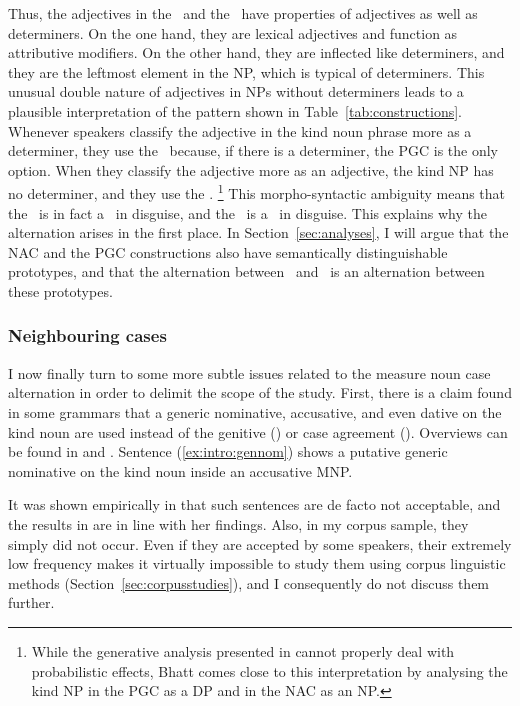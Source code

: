 Thus, the adjectives in the \NACa\ and the \PGCa\ have properties of adjectives as well as determiners.
On the one hand, they are lexical adjectives and function as attributive modifiers.
On the other hand, they are inflected like determiners, and they are the leftmost element in the NP, which is typical of determiners.
This unusual double nature of adjectives in NPs without determiners leads to a plausible interpretation of the pattern shown in Table~\ref{tab:constructions}.
Whenever speakers classify the adjective in the kind noun phrase more as a determiner, they use the \PGCa\ because, if there is a determiner, the PGC is the only option.
When they classify the adjective more as an adjective, the kind NP has no determiner, and they use the \NACa.%
\footnote{While the generative analysis presented in \cite{Bhatt1990} cannot properly deal with probabilistic effects, Bhatt comes close to this interpretation by analysing the kind NP in the PGC as a DP and in the NAC as an NP.}
This morpho-syntactic ambiguity means that the \NACa\ is in fact a \NACb\ in disguise, and the \PGCa\ is a \PGCd\ in disguise.
This explains why the alternation arises in the first place.
In Section~\ref{sec:analyses}, I will argue that the NAC and the PGC constructions also have semantically distinguishable prototypes, and that the alternation between \PGCa\ and \NACa\ is an alternation between these prototypes.

\subsubsection{Neighbouring cases}
\label{sec:neighbouringcases}

I now finally turn to some more subtle issues related to the measure noun case alternation in order to delimit the scope of the study.
First, there is a claim found in some grammars that a generic nominative, accusative, and even dative on the kind noun are used instead of the genitive (\PGCa) or case agreement (\NACa).
Overviews can be found in \cite{Hentschel1993} and \cite{Zimmer2015}.
Sentence (\ref{ex:intro:gennom}) shows a putative generic nominative on the kind noun inside an accusative MNP.

\begin{exe}
\end{exe}

It was shown empirically in \cite{Hentschel1993} that such sentences are de facto not acceptable, and the results in \citet{Zimmer2015} are in line with her findings.
Also, in my corpus sample, they simply did not occur.
Even if they are accepted by some speakers, their extremely low frequency makes it virtually impossible to study them using corpus linguistic methods (Section~\ref{sec:corpusstudies}), and I consequently do not discuss them further.

